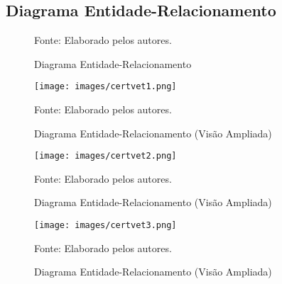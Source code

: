 \documentclass[
    12pt,               %
    openright,          %
    oneside,
    a4paper,            %
    BIBLATEX,           %
    TODO,               %
    english,            %
    brazil              %
    ]{ifsp-spo-inf-ctds}
\begin{document}
                      

        \subsection{Diagrama Entidade-Relacionamento}
        
                

            \begin{figure}[H]
                \centering
                \caption{Diagrama Entidade-Relacionamento}
                
                
                \label{fig:MERv2}
                \centering
        {\footnotesize Fonte: Elaborado pelos autores.}
            \end{figure}


            \begin{figure}[H]
                \centering
                \caption{Diagrama Entidade-Relacionamento (Visão Ampliada)}
                \texttt{[image: images/certvet1.png]}
                
                \label{fig:MERZoom1}
                \centering
        {\footnotesize Fonte: Elaborado pelos autores.}
            \end{figure}



             \begin{figure}[H]
                \centering
                \caption{Diagrama Entidade-Relacionamento (Visão Ampliada)}
                \texttt{[image: images/certvet2.png]}
                
                \label{fig:MERZoom2}
                \centering
        {\footnotesize Fonte: Elaborado pelos autores.}
            \end{figure}




             \begin{figure}[H]
                \centering
                \caption{Diagrama Entidade-Relacionamento (Visão Ampliada)}
                \texttt{[image: images/certvet3.png]}
                
                \label{fig:MERZoom3}
                \centering
        {\footnotesize Fonte: Elaborado pelos autores.}
            \end{figure}
\end{document}
